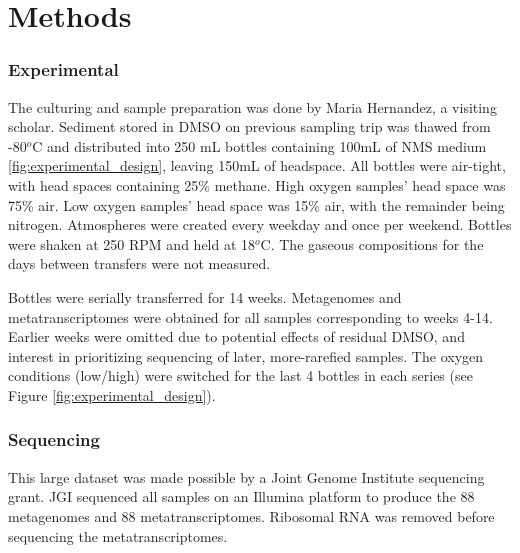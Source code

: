 \section{Methods}

\subsubsection{Experimental}  %
The culturing and sample preparation was done by Maria Hernandez, a visiting scholar.
Sediment stored in DMSO on previous sampling trip was thawed from -80$^o$C and distributed into 250 mL bottles containing 100mL of NMS medium \ref{fig:experimental_design}, leaving 150mL of headspace.
All bottles were air-tight, with head spaces containing 25\% methane.
High oxygen samples' head space was 75\% air.
Low oxygen samples' head space was 15\% air, with the remainder being nitrogen.
Atmospheres were created every weekday and once per weekend.
Bottles were shaken at 250 RPM and held at 18$^o$C.
The gaseous compositions for the days between transfers were not measured.

Bottles were serially transferred for 14 weeks.
Metagenomes and metatranscriptomes were obtained for all samples corresponding to weeks 4-14.
Earlier weeks were omitted due to potential effects of residual DMSO, and interest in prioritizing sequencing of later, more-rarefied samples.
The oxygen conditions (low/high) were switched for the last 4 bottles in each series (see Figure \ref{fig:experimental_design}).

\subsubsection{Sequencing}
This large dataset was made possible by a Joint Genome Institute sequencing grant. %
JGI sequenced all samples on an Illumina platform to produce the 88 metagenomes and 88 metatranscriptomes.
Ribosomal RNA was removed before sequencing the metatranscriptomes.

